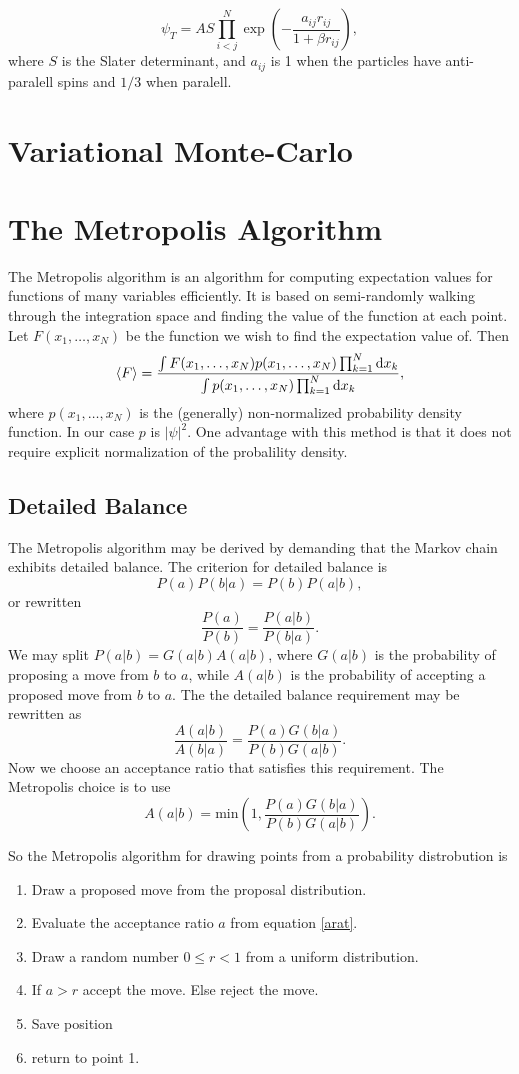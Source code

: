 \documentclass[a4paper,norsk,10pt]{article}
\newcommand{\dd}{\mathrm{d}}
\newcommand{\be}{\begin{equation}}
\newcommand{\ee}{\end{equation}}
\newcommand{\f}{\frac}
\begin{document}
\be
\psi_T = A S\prod_{i<j}^N\exp\left(-\f{a_{ij}r_{ij}}{1+\beta r_{ij}}\right),\label{npw}
\ee
where $S$ is the Slater determinant, and $a_{ij}$ is 1 when the particles have anti-paralell spins and $1/3$ when paralell.

\section{Variational Monte-Carlo}





\section{The Metropolis Algorithm}

The Metropolis algorithm is an algorithm for computing expectation values for functions of many variables efficiently.
It is based on semi-randomly walking through the integration space and finding the value of the function at each point.
Let \(F(x_1,\ldots,x_N)\) be the function we wish to find the expectation value of. Then
\be
\braket{F} = \f{\int F(x_1,\ldots,x_N)p(x_1,\ldots,x_N)\prod_{k=1}^N\dd x_k}{\int p(x_1,\ldots,x_N)\prod_{k=1}^N\dd x_k}, \label{exp}
\ee
where \(p(x_1,\ldots,x_N)\) is the (generally) non-normalized probability density function. In our case \(p\) is \(|\psi|^2\).
One advantage with this method is that it does not require explicit normalization of the probalility density.



\subsection{Detailed Balance}
The Metropolis algorithm may be derived by demanding that the Markov chain exhibits detailed balance.
The criterion for detailed balance is
\be
P(a)P(b|a) = P(b)P(a|b),
\ee
or rewritten
\be
\f{P(a)}{P(b)} = \f{P(a|b)}{P(b|a)}.
\ee
We may split \(P(a|b) = G(a|b)A(a|b)\), where \(G(a|b)\) is the probability of proposing a move from $b$ to $a$, while
$A(a|b)$ is the probability of accepting a proposed move from $b$ to $a$. The the detailed balance requirement may be rewritten as
\be
\f{A(a|b)}{A(b|a)} = \f{P(a)G(b|a)}{P(b)G(a|b)}.
\ee
Now we choose an acceptance ratio that satisfies this requirement. The Metropolis choice is to use
\be
A(a|b) = \mathrm{min}\left(1,\f{P(a)G(b|a)}{P(b)G(a|b)}\right).\label{arat}
\ee

So the Metropolis algorithm for drawing points from a probability distrobution is
\begin{enumerate}
\item
  Draw a proposed move from the proposal distribution.
\item
  Evaluate the acceptance ratio $a$ from equation \ref{arat}.
\item
  Draw a random number $0 \leq r < 1$ from a uniform distribution.
\item
  If $a>r$ accept the move. Else reject the move.
\item
  Save position
\item
  return to point 1.
\end{enumerate}
  
\end{document}
